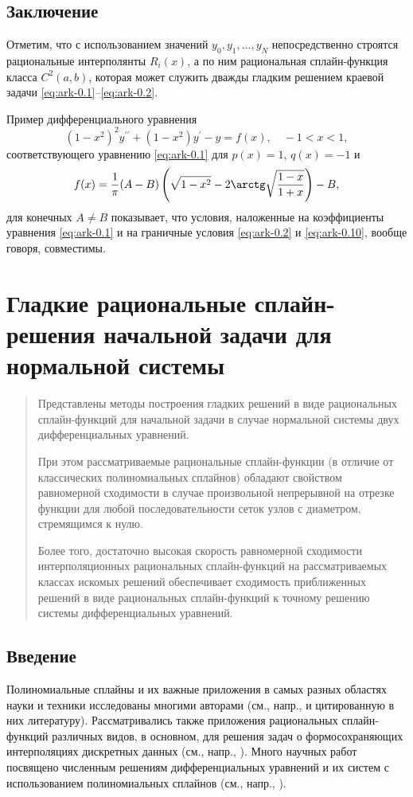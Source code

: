 \subsection{Заключение}

Отметим, что с использованием значений $y_0,y_1,\dots,y_N$
непосредственно строятся рациональные интерполянты $R_i(x)$, а по ним 
рациональная сплайн-функция класса $C^2(a,b)$, которая может служить дважды гладким
решением краевой задачи \eqref{eq:ark-0.1}--\eqref{eq:ark-0.2}.

Пример дифференциального уравнения
$$
(1-x^2)^2y^{\prime\prime}+(1-x^2)y^\prime-y=f(x),\quad -1<x<1,
$$
соответствующего уравнению \eqref{eq:ark-0.1} для $p(x)=1$, $q(x)=-1$ и 
$$
f(x)=\frac 1\pi (A-B)\left(\sqrt{1-x^2}-2 \arctg\sqrt{\frac{1-x}{1+x}}\right)-B,
$$
для конечных $A\ne B$ показывает, что условия, наложенные на коэффициенты уравнения 
\eqref{eq:ark-0.1} и на граничные условия \eqref{eq:ark-0.2} и \eqref{eq:ark-0.10}, вообще говоря, 
совместимы. 


\section{Гладкие рациональные сплайн-решения начальной задачи для нормальной системы}
\begin{abstract}

Представлены методы построения гладких решений в виде рациональных сплайн-функций 
для начальной задачи в случае нормальной системы двух дифференциальных уравнений.

При этом рассматриваемые рациональные сплайн-функции (в отличие 
от классических полиномиальных сплайнов) обладают свойством 
равномерной сходимости в случае произвольной непрерывной на отрезке 
функции для любой последовательности сеток узлов с диаметром, стремящимся к нулю.  

Более того, достаточно высокая скорость равномерной сходимости интерполяционных 
рациональных сплайн-функций на рассматриваемых классах искомых решений 
обеспечивает сходимость приближенных решений в виде рациональных 
сплайн-функций к точному решению системы дифференциальных уравнений.

\end{abstract}

\subsection{Введение}

Полиномиальные сплайны и их важные приложения в самых разных областях науки и 
техники исследованы многими авторами (см., напр., \cite{bib:ark-14,bib:ark-15,bib:ark-16} и цитированную в них 
литературу).
Рассматривались также приложения рациональных сплайн-функций различных видов, 
в основном, для решения задач о формосохраняющих интерполяциях дискретных данных 
(см., напр., \cite{bib:ark-16,bib:ark-17,bib:ark-18}). 
Много научных работ посвящено численным решениям дифференциальных уравнений и 
их систем с использованием полиномиальных сплайнов (см., напр., \cite{bib:ark-14,bib:ark-15,bib:ark-16}).

